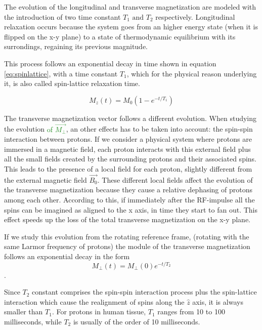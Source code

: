 \documentclass[11pt]{report}
\begin{document}
The evolution of the longitudinal and transverse magnetization are modeled with the introduction of two time constant $T_1 \text{ and } T_2$ respectively.
Longitudinal relaxation occurs because the system goes from an higher energy state (when it is flipped on the x-y plane) to a state of thermodynamic equilibrium with its surrondings, regaining its previous magnitude.

This process follows an exponential decay in time shown in equation \ref{eq:spinlattice}, with a time constant $T_1$, which for the physical reason underlying it, is also called spin-lattice relaxation time.

\begin{equation}\label{eq:spinlattice}
M_z(t) = M_0 (1-e^{-t/T_1})
\end{equation}


The transverse magnetization vector follows a different evolution.
When studying the evolution \textcolor{ForestGreen}{of $\vec{M_\perp}$}, an other effects has to be taken into account: the spin-spin interaction between protons.
If we consider a physical system where protons are immersed in a magnetic field, each proton interacts with this external field plus all the small fields created by the surrounding protons and their associated spins. This leads to the presence of a local field for each proton, slightly different from the external magnetic field $\vec{B_0}$.
These different local fields affect the evolution of the transverse magnetization because they cause a relative dephasing of protons among each other.
According to this, if immediately after the RF-impulse all the spins can be imagined as aligned to the x axis, in time they start to fan out.
This effect speeds up the loss of the total transverse magnetization on the x-y plane.

If we study this evolution from the rotating reference frame, (rotating with the same Larmor frequency of protons) the module of the transverse magnetization follows an exponential decay in the form
\begin{equation}
M_\perp(t) = M_\perp(0) e^{-t/T_2}
\end{equation}.

Since $T_2$ constant comprises the spin-spin interaction process plus the spin-lattice interaction which cause the realignment of spins along the $\hat z$ axis, it is always smaller than $T_1$.
For protons in human tissue, $T_1$ ranges from 10 to 100 milliseconds, while $T_2$ is usually of the order of 10 milliseconds.
\end{document}
